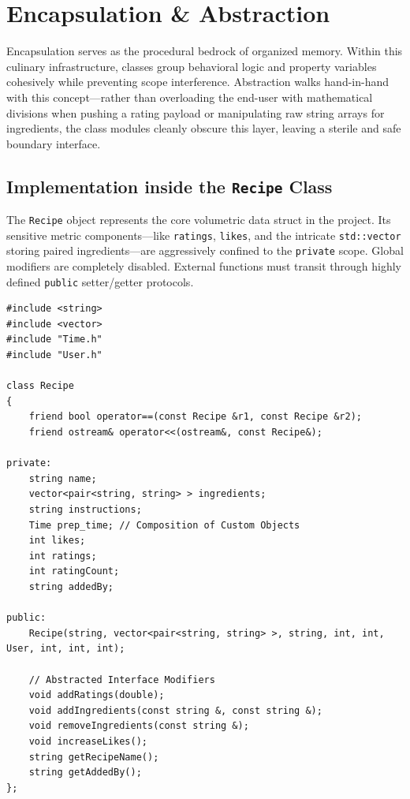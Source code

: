 \documentclass[12pt, a4paper]{article}
\begin{document}
\section{Encapsulation \& Abstraction}

Encapsulation serves as the procedural bedrock of organized memory. Within this culinary infrastructure, classes group behavioral logic and property variables cohesively while preventing scope interference. Abstraction walks hand-in-hand with this concept—rather than overloading the end-user with mathematical divisions when pushing a rating payload or manipulating raw string arrays for ingredients, the class modules cleanly obscure this layer, leaving a sterile and safe boundary interface.

\subsection{Implementation inside the \texttt{Recipe} Class}
The \texttt{Recipe} object represents the core volumetric data struct in the project. Its sensitive metric components—like \texttt{ratings}, \texttt{likes}, and the intricate \texttt{std::vector} storing paired ingredients—are aggressively confined to the \texttt{private} scope. Global modifiers are completely disabled. External functions must transit through highly defined \texttt{public} setter/getter protocols.

\begin{lstlisting}[caption={Recipe.h - Defining Encapsulation for Core Data Models}]
#include <string>
#include <vector>
#include "Time.h"
#include "User.h"

class Recipe
{
    friend bool operator==(const Recipe &r1, const Recipe &r2);
    friend ostream& operator<<(ostream&, const Recipe&);

private:
    string name;
    vector<pair<string, string> > ingredients;
    string instructions;
    Time prep_time; // Composition of Custom Objects
    int likes;
    int ratings;
    int ratingCount;
    string addedBy;

public:
    Recipe(string, vector<pair<string, string> >, string, int, int, User, int, int, int);
    
    // Abstracted Interface Modifiers
    void addRatings(double);
    void addIngredients(const string &, const string &);
    void removeIngredients(const string &);
    void increaseLikes();
    string getRecipeName();
    string getAddedBy();
};
\end{lstlisting}
\end{document}
